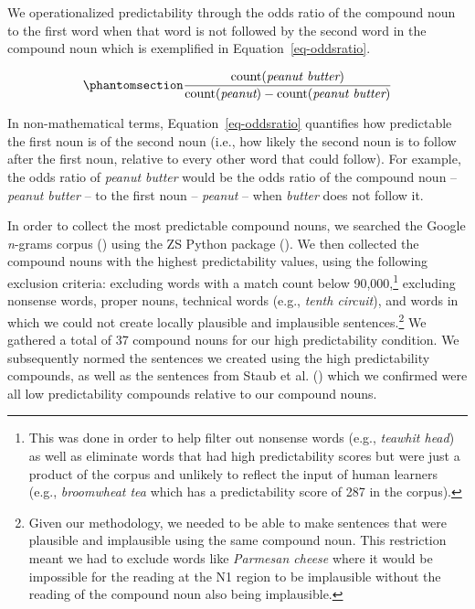 \documentclass[
  12pt,
  letterpaper,
]{scrreprt}
\begin{document}
We operationalized predictability through the odds ratio of the compound
noun to the first word when that word is not followed by the second word
in the compound noun which is exemplified in
Equation~\ref{eq-oddsratio}.

\begin{equation}\phantomsection\label{eq-oddsratio}{
\frac{\mathrm{count(\textit{peanut butter})}}{\mathrm{count(\textit{peanut})} - \mathrm{count(\textit{peanut butter})}} 
}\end{equation}

In non-mathematical terms, Equation~\ref{eq-oddsratio} quantifies how
predictable the first noun is of the second noun (i.e., how likely the
second noun is to follow after the first noun, relative to every other
word that could follow). For example, the odds ratio of \emph{peanut
butter} would be the odds ratio of the compound noun -- \emph{peanut
butter} -- to the first noun -- \emph{peanut} -- when \emph{butter} does
not follow it.

In order to collect the most predictable compound nouns, we searched the
Google \emph{n}-grams corpus
() using the ZS Python package
(). We then collected
the compound nouns with the highest predictability values, using the
following exclusion criteria: excluding words with a match count below
90,000,\footnote{This was done in order to help filter out nonsense
  words (e.g., \emph{teawhit head}) as well as eliminate words that had
  high predictability scores but were just a product of the corpus and
  unlikely to reflect the input of human learners (e.g.,
  \emph{broomwheat tea} which has a predictability score of 287 in the
  corpus).} excluding nonsense words, proper nouns, technical words
(e.g., \emph{tenth circuit}), and words in which we could not create
locally plausible and implausible sentences.\footnote{Given our
  methodology, we needed to be able to make sentences that were
  plausible and implausible using the same compound noun. This
  restriction meant we had to exclude words like \emph{Parmesan cheese}
  where it would be impossible for the reading at the N1 region to be
  implausible without the reading of the compound noun also being
  implausible.} We gathered a total of 37 compound nouns for our high
predictability condition. We subsequently normed the sentences we
created using the high predictability compounds, as well as the
sentences from Staub et al.
() which we
confirmed were all low predictability compounds relative to our compound
nouns.
\end{document}
